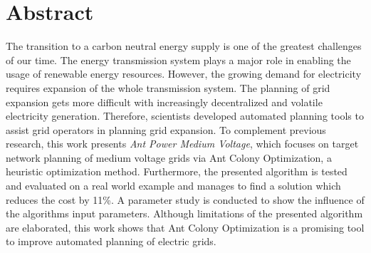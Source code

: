 \chapter*{Abstract}
The transition to a carbon neutral energy supply is one of the greatest challenges of our time. The energy transmission system plays a major role in enabling the usage of renewable energy resources. However, the growing demand for electricity requires expansion of the whole transmission system. The planning of grid expansion gets more difficult with increasingly decentralized and volatile electricity generation. Therefore, scientists developed automated planning tools to assist grid operators in planning grid expansion. To complement previous research, this work presents \textit{Ant Power Medium Voltage}, which focuses on target network planning of medium voltage grids via Ant Colony Optimization, a heuristic optimization method. Furthermore, the presented algorithm is tested and evaluated on a real world example and manages to find a solution which reduces the cost by 11\%. A parameter study is conducted to show the influence of the algorithms input parameters. Although limitations of the presented algorithm are elaborated, this work shows that Ant Colony Optimization is a promising tool to improve automated planning of electric grids.